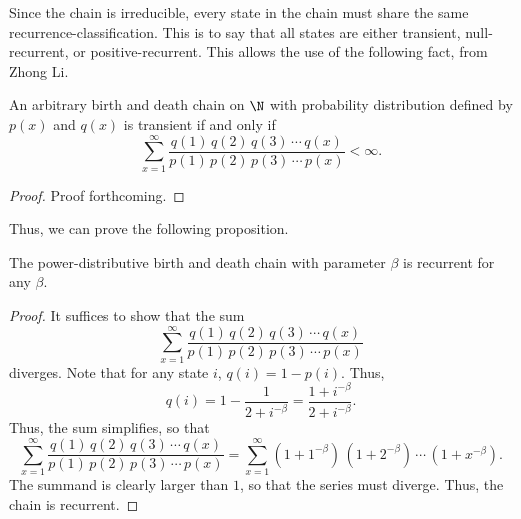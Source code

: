 Since the chain is irreducible, every state in the chain must share the same recurrence-classification.
This is to say that all states are either transient, null-recurrent, or positive-recurrent. This allows
the use of the following fact, from Zhong Li.
\begin{proposition}
    An arbitrary birth and death chain on $\N$ with probability distribution defined by $p(x)$ and
    $q(x)$ is transient if and only if
    \[
        \sum_{x = 1}^{\infty} \frac{q(1)\,q(2)\,q(3)\,\cdots\,q(x)}{p(1)\,p(2)\,p(3)\,\cdots\,p(x)} <
        \infty.  
    \]
\end{proposition}
\begin{proof}
    Proof forthcoming.
\end{proof}

Thus, we can prove the following proposition.
\begin{proposition}
    The power-distributive birth and death chain with parameter $\beta$ is recurrent for any $\beta$.
\end{proposition}
\begin{proof}
    It suffices to show that the sum
    \[
        \sum_{x = 1}^{\infty} \frac{q(1)\,q(2)\,q(3)\,\cdots\,q(x)}{p(1)\,p(2)\,p(3)\,\cdots\,p(x)}
    \]
    diverges. Note that for any state $i$, $q(i) = 1-p(i)$. Thus,
    \[
        q(i) = 1 - \frac{1}{2 + i^{-\beta}} = \frac{1 + i^{-\beta}}{2 + i^{-\beta}}.  
    \]
    Thus, the sum simplifies, so that
    \[
        \sum_{x = 1}^{\infty} \frac{q(1)\,q(2)\,q(3)\,\cdots\,q(x)}{p(1)\,p(2)\,p(3)\,\cdots\,p(x)} =
        \sum_{x = 1}^{\infty} (1+1^{-\beta})\,(1+2^{-\beta})\,\cdots\,(1 + x^{-\beta}).
    \]
    The summand is clearly larger than $1$, so that the series must diverge. Thus, the chain is
    recurrent.
\end{proof}

